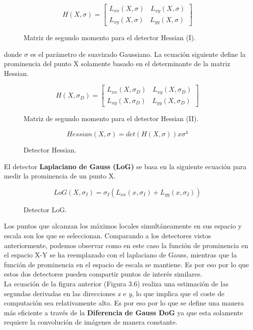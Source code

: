 \begin{figure}[htbp]
\centering
\[
H( X,  \sigma) = 
\begin{bmatrix}
L_{xx}(X,\sigma) \:\:\:\: L_{xy}(X,\sigma) \\
L_{xy}(X,\sigma) \:\:\:\: L_{yy}(X,\sigma)
\end{bmatrix}
\]
\caption{Matriz de segundo momento para el detector Hessian (I).} 
\end{figure}

donde $\sigma$  es el parámetro de suavizado Gaussiano. La ecuación siguiente define la prominencia del punto X solamente basado en el determinante de la matriz Hessian. \\

\begin{figure}[htbp]
\centering
\[
H( X, \sigma _{D} ) = 
\begin{bmatrix}
L_{xx}(X,\sigma_{D}) \:\:\:\: L_{xy}(X,\sigma_{D}) \\
L_{xy}(X,\sigma_{D}) \:\:\:\: L_{yy}(X,\sigma_{D})
\end{bmatrix}
\] 
\caption{Matriz de segundo momento para el detector Hessian (II).} 
\end{figure}

\begin{figure}[htbp]
\centering
\[
Hessian(X, \sigma) = det(H(X,\sigma)) x \sigma^4
\]
\caption{Detector Hessian.} 
\end{figure}

El detector \textbf{Laplaciano de Gauss (LoG)} se basa en la siguiente ecuación para medir la prominencia de un punto X. 

\begin{figure}[htbp]
\centering
\[
LoG(X, \sigma_{I}) = \sigma_{I}(L_{xx}(x,\sigma_{I}) + L_{yy}(x,\sigma_{I}))
\]
\caption{Detector LoG.} 
\end{figure}

Los puntos que alcanzan los máximos locales simultáneamente en sus espacio y escala son los que se seleccionan. Comparando a los detectores vistos anteriormente, podemos observar como en este caso la función de prominencia en el espacio X-Y se ha reemplazado con el laplaciano de Gauss, mientras que la función de prominencia en el espacio de escala se mantiene. Es por eso por lo que estos dos detectores pueden compartir puntos de interés similares. \\

La ecuación de la figura anterior (Figura 3.6) realiza una estimación de las segundas derivadas en las direcciones \textit{x} e \textit{y}, lo que implica que el coste de computación sea relativamente alto. Es por eso por lo que se define una manera más eficiente a través de la \textbf{Diferencia de Gauss DoG} ya que esta solamente requiere la convolución de imágenes de manera constante. \\ \\ \\ \\ \\ \\

